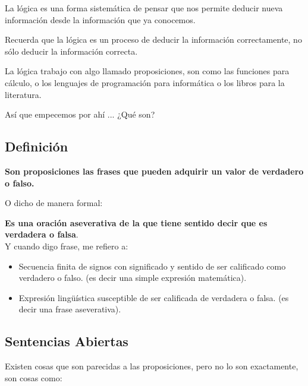 \documentclass[12pt]{report}                                    %
\begin{document}
        La lógica es una forma sistemática de pensar que nos permite deducir nueva información desde la
        información que ya conocemos.

        Recuerda que la lógica es un proceso de deducir la información correctamente,
        no sólo deducir la información correcta.

        La lógica trabajo con algo llamado proposiciones, son como las funciones para
        cálculo, o los lenguajes de programación para informática o los libros para la literatura.

        Así que empecemos por ahí ... ¿Qué son?


        \subsection*{Definición}
            
            \textbf{Son proposiciones las frases que pueden adquirir un valor de verdadero o falso.}
            
            O dicho de manera formal:

            \textbf{Es una oración aseverativa de la que tiene sentido decir que es verdadera o falsa}.\\

            Y cuando digo frase, me refiero a:
            \begin{itemize}
                \item Secuencia finita de signos con significado y sentido de ser calificado como verdadero o falso.
                        (es decir una simple expresión matemática).

                \item Expresión lingüística susceptible de ser calificada de verdadera o falsa.
                        (es decir una frase aseverativa).
            \end{itemize}


        \subsection*{Sentencias Abiertas}
            Existen cosas que son parecidas a las proposiciones, pero no lo son exactamente, son cosas como:
\end{document}
